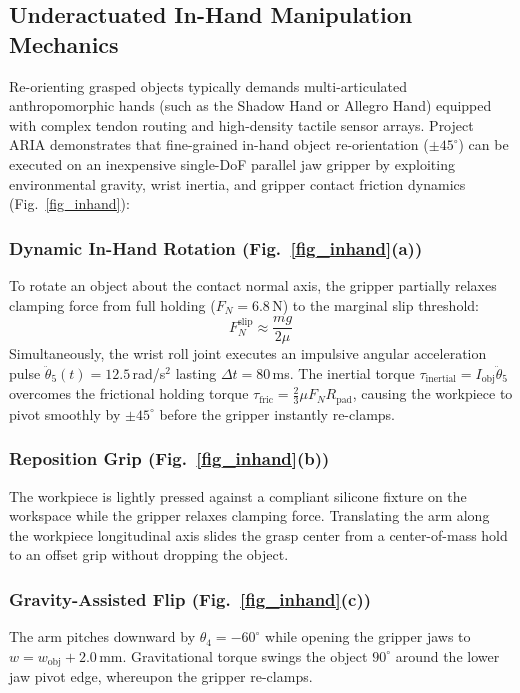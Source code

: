\documentclass[journal]{IEEEtran}
\begin{document}
\subsection{Underactuated In-Hand Manipulation Mechanics}
Re-orienting grasped objects typically demands multi-articulated anthropomorphic hands (such as the Shadow Hand or Allegro Hand) equipped with complex tendon routing and high-density tactile sensor arrays. Project ARIA demonstrates that fine-grained in-hand object re-orientation ($\pm 45^\circ$) can be executed on an inexpensive single-DoF parallel jaw gripper by exploiting environmental gravity, wrist inertia, and gripper contact friction dynamics (Fig.~\ref{fig_inhand}):

\subsubsection{Dynamic In-Hand Rotation (Fig.~\ref{fig_inhand}(a))}
To rotate an object about the contact normal axis, the gripper partially relaxes clamping force from full holding ($F_N = 6.8$\,N) to the marginal slip threshold:
\begin{equation}
F_N^{\text{slip}} \approx \frac{m g}{2 \mu}
\end{equation}
Simultaneously, the wrist roll joint executes an impulsive angular acceleration pulse $\ddot{\theta}_5(t) = 12.5$\,rad/s$^2$ lasting $\Delta t = 80$\,ms. The inertial torque $\tau_{\text{inertial}} = I_{\text{obj}} \ddot{\theta}_5$ overcomes the frictional holding torque $\tau_{\text{fric}} = \frac{2}{3} \mu F_N R_{\text{pad}}$, causing the workpiece to pivot smoothly by $\pm 45^\circ$ before the gripper instantly re-clamps.

\subsubsection{Reposition Grip (Fig.~\ref{fig_inhand}(b))}
The workpiece is lightly pressed against a compliant silicone fixture on the workspace while the gripper relaxes clamping force. Translating the arm along the workpiece longitudinal axis slides the grasp center from a center-of-mass hold to an offset grip without dropping the object.

\subsubsection{Gravity-Assisted Flip (Fig.~\ref{fig_inhand}(c))}
The arm pitches downward by $\theta_4 = -60^\circ$ while opening the gripper jaws to $w = w_{\text{obj}} + 2.0$\,mm. Gravitational torque swings the object $90^\circ$ around the lower jaw pivot edge, whereupon the gripper re-clamps.
\end{document}
